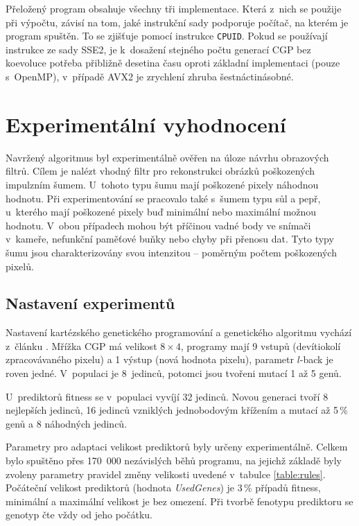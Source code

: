 \documentclass[czech]{ExcelAtFIT} %
\begin{document}
Přeložený program obsahuje všechny tři implementace. Která z~nich se použije při výpočtu, závisí na tom, jaké instrukční sady podporuje počítač, na kterém je program spuštěn. To se zjišťuje pomocí instrukce \texttt{CPUID}. Pokud se používají instrukce ze sady SSE2, je k~dosažení stejného počtu generací CGP bez koevoluce potřeba přibližně desetina času oproti základní implementaci (pouze s~OpenMP), v~případě AVX2 je zrychlení zhruba šest\-nác\-ti\-ná\-sobné.

\section{Experimentální vyhodnocení}
\label{sec:Experimental}

Navržený algoritmus byl experimentálně ověřen na úloze návrhu obrazových filtrů. Cílem je nalézt vhodný filtr pro rekonstrukci obrázků poškozených impulzním šumem. U~tohoto typu šumu mají poškozené pixely náhodnou hodnotu. Při experimentování se pra\-co\-valo také s~šumem typu sůl a pepř, u~kterého mají poškozené pixely buď minimální nebo maximální možnou hodnotu. V~obou případech mohou být příčinou vadné body ve snímači v~kameře, nefunkční paměťové buňky nebo chyby při přenosu dat. Tyto typy šumu jsou charakterizovány svou in\-ten\-zi\-tou -- poměrným poč\-tem poškozených pixelů.

\subsection{Nastavení experimentů}

Nastavení kartézského genetického programování a genetického algoritmu vychází z~článku \cite{SikuPPSN}. Mřížka CGP má velikost $8 \times 4$, programy mají 9 vstupů (devíti\-okolí zpracovávaného pixelu) a 1 výstup (nová hodnota pixelu), parametr $l$-back je roven jedné. V~populaci je 8~jedinců, potomci jsou tvořeni mutací 1 až 5 genů.

U~prediktorů fitness se v~populaci vyvíjí 32 jedinců. Novou generaci tvoří 8 nejlepších jedinců, 16 jedinců vzniklých jednobodovým křížením a mutací až 5\,\% genů a 8 náhodných jedinců.

Parametry pro adaptaci velikost prediktorů byly určeny experimentálně. Celkem bylo spuštěno přes 170~000 nezávislých běhů programu, na jejichž základě byly zvoleny parametry pravidel změny velikosti uvedené v~tabulce \ref{table:rules}. Počáteční velikost prediktorů (hodnota \textit{UsedGenes}) je 3\,\% případů fitness, minimální a maximální velikost je bez omezení. Při tvorbě fenotypu prediktoru se ge\-notyp čte vždy od jeho počátku.
\end{document}
